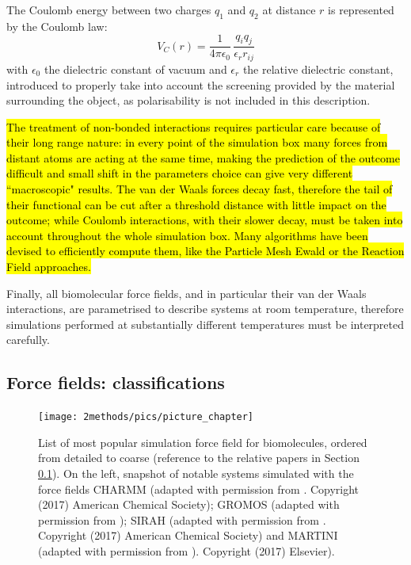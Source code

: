 The Coulomb energy between two charges $q_1$ and $q_2$ at distance $r$ is represented by the Coulomb law:
\begin{equation}
V_C(r) = \frac{1}{4 \pi \epsilon_0} \, \frac{q_i q_j}{\epsilon_r r_{ij}}
\end{equation}
with $\epsilon_0$ the dielectric constant of vacuum and $\epsilon_r$ the relative dielectric constant, introduced to properly take into account the screening provided by the material surrounding the object, as polarisability is not included in this description.

\hl{The treatment of non-bonded interactions requires particular care because of their long range nature: in every point of the simulation box many forces from distant atoms are acting at the same time, making the prediction of the outcome difficult and small shift in the parameters choice can give very different ``macroscopic" results.
%
The van der Waals forces decay fast, therefore the tail of their functional can be cut after a threshold distance with little impact on the outcome; while Coulomb interactions, with their slower decay, must be taken into account throughout the whole simulation box. Many algorithms have been devised to efficiently compute them, like the Particle Mesh Ewald \cite{Essmann1995} or the Reaction Field \cite{Tironi1995} approaches.}

Finally, all biomolecular force fields, and in particular their van der Waals interactions, are parametrised to describe systems at room temperature, therefore simulations performed at substantially different temperatures must be interpreted carefully.


\subsection{Force fields: classifications} \label{sec:ff_ex}

\begin{figure}[p!]
\centering
\texttt{[image: 2methods/pics/picture\_chapter]}
%
\caption[MD force field classifications]{List of most popular simulation force field for biomolecules, ordered from detailed to coarse (reference to the relative papers in Section \ref{sec:ff_ex}). On the left, snapshot of notable systems simulated with the force fields CHARMM (adapted with permission from \cite{Lipkin2017}. Copyright (2017) American Chemical Society); GROMOS (adapted with permission from \cite{Macpherson2019}); SIRAH (adapted with permission from \cite{Machado2017}. Copyright (2017) American Chemical Society) and MARTINI (adapted with permission from \cite{Samsudin2017}). Copyright (2017) Elsevier).}
\label{fig:ff}
\end{figure}

